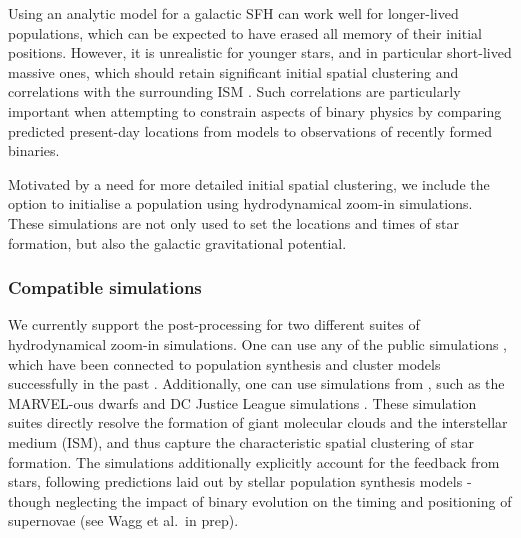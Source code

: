 \documentclass[twocolumn, twocolappendix, oneside, linenumbers]{aastex631}
\begin{document}
Using an analytic model for a galactic SFH can work well for longer-lived populations, which can be expected to have erased all memory of their initial positions. However, it is unrealistic for younger stars, and in particular short-lived massive ones, which should retain significant initial spatial clustering and correlations with the surrounding ISM \citep[e.g.,][]{Sarbadhicary+2023:2023arXiv231017694S}. Such correlations are particularly important when attempting to constrain aspects of binary physics by comparing predicted present-day locations from \cogsworth models to observations of recently formed binaries.%

Motivated by a need for more detailed initial spatial clustering, we include the option to initialise a \cogsworth population using hydrodynamical zoom-in simulations. These simulations are not only used to set the locations and times of star formation, but also the galactic gravitational potential. 

\subsubsection{Compatible simulations}

We currently support the post-processing for two different suites of hydrodynamical zoom-in simulations. One can use any of the public \fire simulations \citep{Wetzel+2016, Hopkins+2018:2018MNRAS.480..800H, Sanderson+2020}, which have been connected to population synthesis and cluster models successfully in the past \citep[e.g.,][]{Lamberts+2018:2018MNRAS.480.2704L, Chawla+2022:2022ApJ...931..107C, balls_of_FIRE_1, balls_of_FIRE_2, Thiele+2023:2023ApJ...945..162T}. Additionally, one can use simulations from \changa, such as the MARVEL-ous dwarfs and DC Justice League simulations \citep{Applebaum+2021:2021ApJ...906...96A, Christensen+2023:2023AAS...24140704C}. These simulation suites directly resolve the formation of giant molecular clouds and the interstellar medium (ISM), and thus capture the characteristic spatial clustering of star formation. The simulations additionally explicitly account for the feedback from stars, following predictions laid out by stellar population synthesis models - though neglecting the impact of binary evolution on the timing and positioning of supernovae (see Wagg et al.\ in prep).
\end{document}
